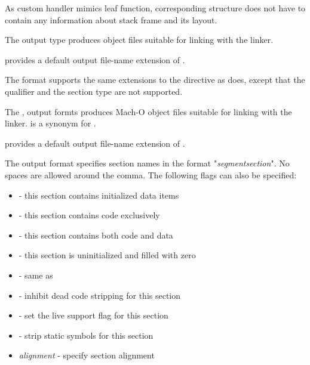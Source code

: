 As custom handler mimics leaf function, corresponding 
structure does not have to contain any information about stack frame
and its layout.


The  output type produces  object files suitable for
linking with the  linker.

 provides a default output file-name extension of .

The  format supports the same extensions to the 
directive as  does, except that the  qualifier and
the  section type are not supported.


The ,  output formts produces Mach-O
object files suitable for linking with the  linker.
 is a synonym for .

 provides a default output file-name extension of .


The  output format specifies section names in the format
"\emph{segment}\code{,}\emph{section}". No spaces are allowed around the
comma. The following flags can also be specified:

\begin{itemize}
    \item{ - this section contains initialized data items}
    \item{ - this section contains code exclusively}
    \item{ - this section contains both code and data}
    \item{ - this section is uninitialized and filled with zero}
    \item{ - same as }
    \item{ - inhibit dead code stripping for this section}
    \item{ - set the live support flag for this section}
    \item{ - strip static symbols for this section}
    \item{\emph{alignment} - specify section alignment}
\end{itemize}

